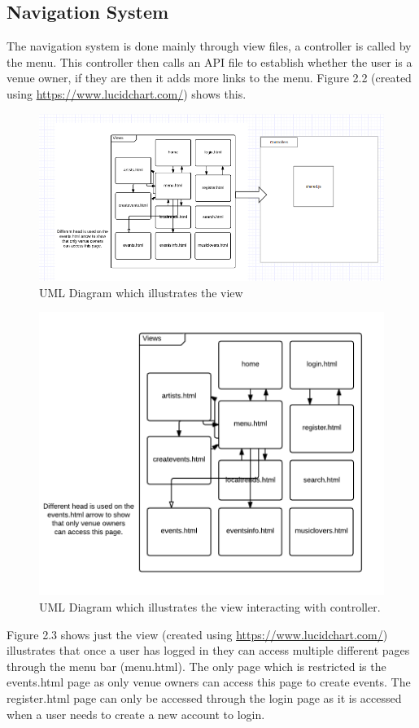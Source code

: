 \subsection{Navigation System}
The navigation system is done mainly through view files, a controller is called by the menu. This controller then calls an API file to establish whether the user is a venue owner, if they are then it adds more links to the menu. Figure 2.2 (created using \url{https://www.lucidchart.com/}) shows this.

\begin{figure}[H]
\includegraphics[width=\textwidth,height=\textheight,keepaspectratio]{images/systemdesign}
\caption{UML Diagram which illustrates the view}
\end{figure}

\begin{figure}[H]
\includegraphics[width=\textwidth,height=\textheight,keepaspectratio]{images/va}
\caption{UML Diagram which illustrates the view interacting with controller.}
\end{figure}
Figure 2.3 shows just the view (created using \url{https://www.lucidchart.com/}) illustrates that once a user has logged in they can access multiple different pages through the menu bar (menu.html). The only page which is restricted is the events.html page as only venue owners can access this page to create events. The register.html page can only be accessed through the login page as it is accessed when a user needs to create a new account to login.

